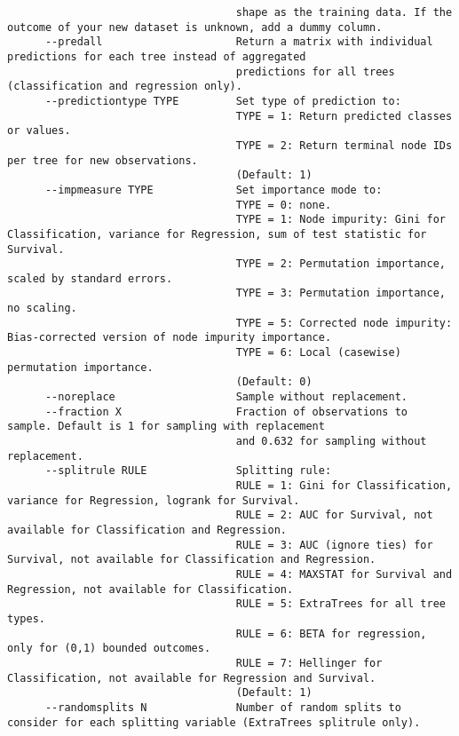 \documentclass[12pt,oneside]{book}
\begin{document}
\begin{lstlisting}
                                    shape as the training data. If the outcome of your new dataset is unknown, add a dummy column.
      --predall                     Return a matrix with individual predictions for each tree instead of aggregated 
                                    predictions for all trees (classification and regression only).
      --predictiontype TYPE         Set type of prediction to:
                                    TYPE = 1: Return predicted classes or values.
                                    TYPE = 2: Return terminal node IDs per tree for new observations.
                                    (Default: 1)
      --impmeasure TYPE             Set importance mode to:
                                    TYPE = 0: none.
                                    TYPE = 1: Node impurity: Gini for Classification, variance for Regression, sum of test statistic for Survival.
                                    TYPE = 2: Permutation importance, scaled by standard errors.
                                    TYPE = 3: Permutation importance, no scaling.
                                    TYPE = 5: Corrected node impurity: Bias-corrected version of node impurity importance.
                                    TYPE = 6: Local (casewise) permutation importance.
                                    (Default: 0)
      --noreplace                   Sample without replacement.
      --fraction X                  Fraction of observations to sample. Default is 1 for sampling with replacement 
                                    and 0.632 for sampling without replacement.
      --splitrule RULE              Splitting rule:
                                    RULE = 1: Gini for Classification, variance for Regression, logrank for Survival.
                                    RULE = 2: AUC for Survival, not available for Classification and Regression.
                                    RULE = 3: AUC (ignore ties) for Survival, not available for Classification and Regression.
                                    RULE = 4: MAXSTAT for Survival and Regression, not available for Classification.
                                    RULE = 5: ExtraTrees for all tree types.
                                    RULE = 6: BETA for regression, only for (0,1) bounded outcomes.
                                    RULE = 7: Hellinger for Classification, not available for Regression and Survival.
                                    (Default: 1)
      --randomsplits N              Number of random splits to consider for each splitting variable (ExtraTrees splitrule only).

\end{lstlisting}
\end{document}
